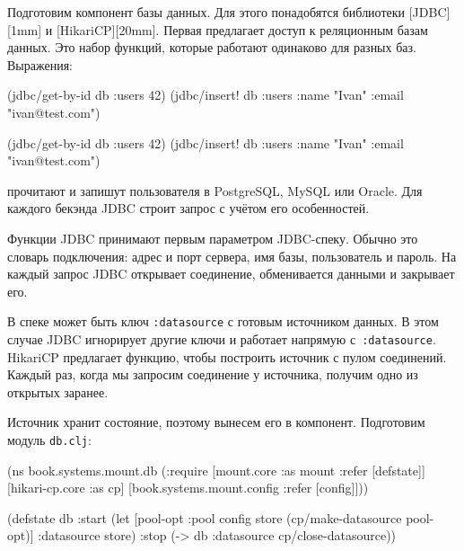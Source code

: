 Подготовим компонент базы данных. Для этого понадобятся библиотеки
[JDBC][1mm] и
[HikariCP][20mm]. Первая предлагает доступ
к реляционным базам данных. Это набор функций, которые работают одинаково для
разных баз. Выражения:

\ifx\DEVICETYPE\MOBILE

\begin{english}
  \begin{clojure}
(jdbc/get-by-id db :users 42)
(jdbc/insert! db :users
  {:name "Ivan" :email "ivan@test.com"})
  \end{clojure}
\end{english}

\else

\begin{english}
  \begin{clojure}
(jdbc/get-by-id db :users 42)
(jdbc/insert! db :users {:name "Ivan" :email "ivan@test.com"})
  \end{clojure}
\end{english}

\fi

\noindent
прочитают и запишут пользователя в Postgre\-SQL, MySQL или Oracle. Для каждого
бекэнда JDBC строит запрос с учётом его особенностей.


Функции JDBC принимают первым параметром JDBC-спеку. Обычно это словарь
подключения: адрес и порт сервера, имя базы, пользователь и пароль. На каждый
запрос JDBC открывает соединение, обменивается данными и закрывает его.

В спеке может быть ключ \verb|:datasource| с готовым источником данных. В этом случае
JDBC игнорирует другие ключи и работает напрямую с~\verb|:datasource|. HikariCP
предлагает функцию, чтобы построить источник с пулом соединений. Каждый раз,
когда мы запросим соединение у источника, получим одно из открытых заранее.


Источник хранит состояние, поэтому вынесем его в компонент. Подготовим модуль
\verb|db.clj|:

\ifx\DEVICETYPE\MOBILE

\begin{english}
  \begin{clojure}
(ns book.systems.mount.db
  (:require
   [mount.core :as mount
    :refer [defstate]]
   [hikari-cp.core :as cp]
   [book.systems.mount.config
    :refer [config]]))

(defstate db
  :start
  (let [{pool-opt :pool} config
        store (cp/make-datasource
                pool-opt)]
    {:datasource store})
  :stop
  (-> db
      :datasource
      cp/close-datasource))
  \end{clojure}
\end{english}

